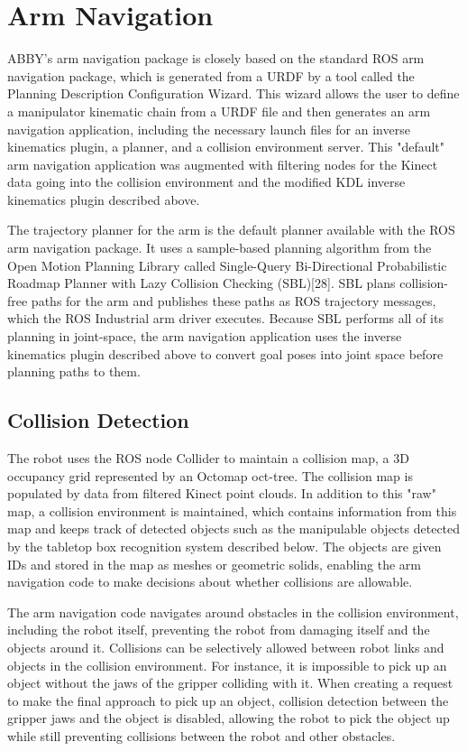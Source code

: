 \documentclass[]{cwru} %
\begin{document}
\section{Arm Navigation}

ABBY's arm navigation package is closely based on the standard ROS arm
navigation package, which is generated from a URDF by a tool called the
Planning Description Configuration Wizard. This wizard allows the user
to define a manipulator kinematic chain from a URDF file and then
generates an arm navigation application, including the necessary launch
files for an inverse kinematics plugin, a planner, and a collision
environment server. This "default" arm navigation application was
augmented with filtering nodes for the Kinect data going into the
collision environment and the modified KDL inverse kinematics plugin
described above.

The trajectory planner for the arm is the default planner available with
the ROS arm navigation package. It uses a sample-based planning
algorithm from the Open Motion Planning Library called Single-Query
Bi-Directional Probabilistic Roadmap Planner with Lazy Collision
Checking (SBL){[}28{]}. SBL plans collision-free paths for the arm and
publishes these paths as ROS trajectory messages, which the ROS
Industrial arm driver executes. Because SBL performs all of its planning
in joint-space, the arm navigation application uses the inverse
kinematics plugin described above to convert goal poses into joint space
before planning paths to them.

\subsection{Collision Detection}

The robot uses the ROS node Collider to maintain a collision map, a 3D
occupancy grid represented by an Octomap oct-tree. The collision map is
populated by data from filtered Kinect point clouds. In addition to this
"raw" map, a collision environment is maintained, which contains
information from this map and keeps track of detected objects such as
the manipulable objects detected by the tabletop box recognition system
described below. The objects are given IDs and stored in the map as
meshes or geometric solids, enabling the arm navigation code to make
decisions about whether collisions are allowable.

The arm navigation code navigates around obstacles in the collision
environment, including the robot itself, preventing the robot from
damaging itself and the objects around it. Collisions can be selectively
allowed between robot links and objects in the collision environment.
For instance, it is impossible to pick up an object without the jaws of
the gripper colliding with it. When creating a request to make the final
approach to pick up an object, collision detection between the gripper
jaws and the object is disabled, allowing the robot to pick the object
up while still preventing collisions between the robot and other
obstacles.
\end{document}

